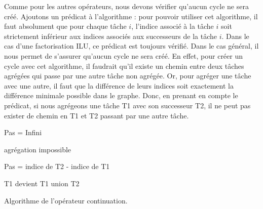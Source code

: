 Comme pour les autres opérateurs, nous devons vérifier qu'aucun cycle ne sera créé.
%
Ajoutons un prédicat à l'algorithme : pour pouvoir utiliser cet algorithme, il faut absolument que pour chaque tâche $i$, l'indice associé à la tâche $i$ soit strictement inférieur aux indices associés aux successeurs de la tâche $i$.
%
Dans le cas d'une factorisation ILU, ce prédicat est toujours vérifié.
%
Dans le cas général, il nous permet de s'assurer qu'aucun cycle ne sera créé.
%
En effet, pour créer un cycle avec cet algorithme, il faudrait qu'il existe un chemin entre deux tâches agrégées qui passe par une autre tâche non agrégée.
%
Or, pour agréger une tâche avec une autre, il faut que la différence de leurs indices soit exactement la différence minimale possible dans le graphe.
%
Donc, en prenant en compte le prédicat, si nous agrégeons une tâche T1 avec son successeur T2, il ne peut pas exister de chemin en T1 et T2 passant par une autre tâche.


\begin{algorithm}
  {\sc Pas} = Infini \\
   {
     {
       {
        \Return agrégation impossible
      }

       {
        {\sc Pas} = indice de {\sc T2} - indice de {\sc T1}
      }
    }
  }

   {
     {
       {
        {\sc T1} devient {\sc T1} union {\sc T2}
      }
    }
  }
  \caption{Algorithme de l'opérateur continuation.}
  \label{algo:algo_C}
\end{algorithm}

